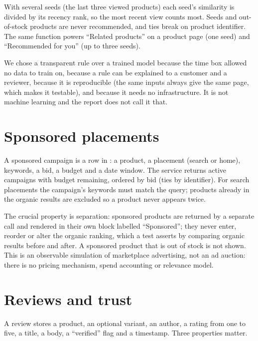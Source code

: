 With several seeds (the last three viewed products) each seed's similarity is divided by its recency rank, so the most recent view counts most. Seeds and out-of-stock products are never recommended, and ties break on product identifier. The same function powers ``Related products'' on a product page (one seed) and ``Recommended for you'' (up to three seeds). \tagimpl{} \tagtest{}

We chose a transparent rule over a trained model because the time box allowed no data to train on, because a rule can be explained to a customer and a reviewer, because it is reproducible (the same inputs always give the same page, which makes it testable), and because it needs no infrastructure. It is not machine learning and the report does not call it that.

\section{Sponsored placements}

A sponsored campaign is a row in : a product, a placement (search or home), keywords, a bid, a budget and a date window. The service returns active campaigns with budget remaining, ordered by bid (ties by identifier). For search placements the campaign's keywords must match the query; products already in the organic results are excluded so a product never appears twice.

The crucial property is separation: sponsored products are returned by a separate call and rendered in their own block labelled ``Sponsored''; they never enter, reorder or alter the organic ranking, which a test asserts by comparing organic results before and after. A sponsored product that is out of stock is not shown. This is an observable simulation of marketplace advertising, not an ad auction: there is no pricing mechanism, spend accounting or relevance model. \tagimpl{} \tagtest{}

\section{Reviews and trust}

A review stores a product, an optional variant, an author, a rating from one to five, a title, a body, a ``verified'' flag and a timestamp. Three properties matter.

